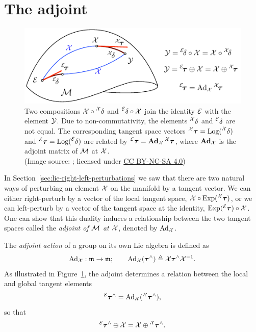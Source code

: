 \section{The adjoint}
\begin{figure}[htb]
    \centering
    \includegraphics[width=0.75\columnwidth]{figures/adjoint.pdf}
    \caption{Two compositions $\mathcal{X} \circ \prescript{\mathcal{X}}{}{\delta}$ and $\prescript{\mathcal{E}}{}{\delta} \circ \mathcal{X} $ join the identity $\mathcal{E}$ with the element $\mathcal{Y}$.
    Due to non-commutativity, the elements $\prescript{\mathcal{X}}{}{\delta}$ and $\prescript{\mathcal{E}}{}{\delta}$ are not equal.
    The corresponding tangent space vectors $\prescript{\mathcal{X}}{}{{\boldsymbol{\mathbf{\tau}}}} = \operatorname*{Log}(\prescript{\mathcal{X}}{}{\delta})$ and $\prescript{\mathcal{E}}{}{{\boldsymbol{\mathbf{\tau}}}} = \operatorname*{Log}(\prescript{\mathcal{E}}{}{\delta})$ are related by $\prescript{\mathcal{E}}{}{{\boldsymbol{\mathbf{\tau}}}} = \boldsymbol{\mathbf{Ad}}_{\mathcal{X}} \prescript{\mathcal{X}}{}{{\boldsymbol{\mathbf{\tau}}}}$, where $\boldsymbol{\mathbf{Ad}}_{\mathcal{X}}$ is the adjoint matrix of $\mathcal{M}$ at $\mathcal{X}$.\\
    (Image source: \cite{SolaARobotics}; licensed under \href{https://creativecommons.org/licenses/by-nc-sa/4.0/}{CC BY-NC-SA 4.0})}
    \label{fig:adjoint}
\end{figure}
%
In Section~\ref{sec:lie-right-left-perturbations} we saw that there are two natural ways of perturbing an element $\mathcal{X}$ on the manifold by a tangent vector.
We can either right-perturb by a vector of the local tangent space, $\mathcal{X} \circ \operatorname*{Exp}(\prescript{\mathcal{X}}{}{{\boldsymbol{\mathbf{\tau}}}})$, or we can left-perturb by a vector of the tangent space at the identity, $\operatorname*{Exp}(\prescript{\mathcal{E}}{}{{\boldsymbol{\mathbf{\tau}}}}) \circ \mathcal{X}$.
One can show that this duality induces a relationship between the two tangent spaces called the \emph{adjoint of $\mathcal{M}$ at $\mathcal{X}$}, denoted by $\operatorname{Ad}_{\mathcal{X}}$.

The \emph{adjoint action} of a group on its own Lie algebra is defined as
\begin{equation} \label{eq:adjoint}
  \operatorname{Ad}_{\mathcal{X}}: {\mathfrak{m}} \to {\mathfrak{m}}; \quad\quad \operatorname{Ad}_{\mathcal{X}}({\boldsymbol{\mathbf{\tau}}}^\wedge) \triangleq \mathcal{X} {\boldsymbol{\mathbf{\tau}}}^\wedge \mathcal{X}^{-1}.
\end{equation}
As illustrated in Figure~\ref{fig:adjoint}, the adjoint determines a relation between the local and global tangent elements
\begin{equation}
  \prescript{\mathcal{E}}{}{{\boldsymbol{\mathbf{\tau}}}}^\wedge = \operatorname{Ad}_{\mathcal{X}}(\prescript{\mathcal{X}}{}{{\boldsymbol{\mathbf{\tau}}}}^\wedge),
\end{equation}
so that 
\begin{equation}
  \prescript{\mathcal{E}}{}{{\boldsymbol{\mathbf{\tau}}}}^\wedge \oplus \mathcal{X} = \mathcal{X} \oplus \prescript{\mathcal{X}}{}{{\boldsymbol{\mathbf{\tau}}}}^\wedge.
\end{equation}

